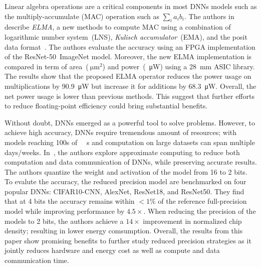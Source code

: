 Linear algebra operations are a critical components in most DNNs models such as 
the multiply-accumulate (MAC) operation such as $\sum_{i}a_{i}b_{i}$.
The authors in~\cite{Johnson2018-up} describe \textit{ELMA}, a new methods to compute MAC using a combination of logarithmic 
number system~(LNS), \textit{Kulisch accumulator}~(EMA), and the posit data format~\cite{Gustafson2017-wo}.
The authors evaluate the accuracy using an FPGA implementation of the ResNet-50~ImageNet model.
Moreover, the new ELMA implementation is compared in term of area~($\SI{}{\micro\metre}^2$)
and power~(\SI{}{\micro\watt}) using a \SI{28}{\milli\metre} ASIC library.
The results show that the proposed ELMA operator reduces the power usage on 
multiplications by \SI{90.9}{\micro\watt} but increase it for additions by \SI{68.3}{\micro\watt}.
Overall, the net power usage is lower than previous methods.
This suggest that further efforts to reduce floating-point efficiency could bring substantial benefits.

Without doubt, DNNs emerged as a powerful tool to solve problems.
However, to achieve high accuracy, DNNs require tremendous amount of resources;
with models reaching 100s of \SI{}{\mega\byte}s and computation on large datasets can span multiple days/weeks.
In~\cite{Chen2018-an}, the authors explore approximate computing to reduce both 
computation and data communication of DNNs, while preserving accurate results.
The authors quantize the weight and activation of the model from 16 to 2 bits.
To evalute the accuracy, the reduced precision model are benchmarked on four popular DNNs: CIFAR10-CNN, AlexNet, ResNet18, and ResNet50.
They find that at 4 bits the accuracy remains within $<1\%$ of the reference 
full-precision model while improving performance by $4.5\times$.
When reducing the precision of the models to 2 bits, the authors achieve a $14\times$
improvement in normalized chip density; resulting in lower energy comsumption.
Overall, the results from this paper show promising benefits to further study reduced 
precision strategies as it jointly reduces hardware and energy cost as well as compute and data communication time.

